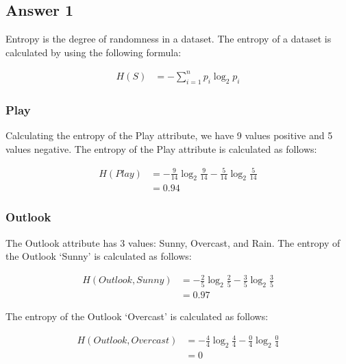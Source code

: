 \documentclass[
  11pt, %
]{assignment}
\begin{document}
\subsection*{Answer 1}

Entropy is the degree of randomness in a dataset. The entropy of a dataset is calculated by using the following formula:

\begin{equation}
	\label{eq:entropy}
	\begin{split}
		H(S) &= -\sum_{i=1}^{n} p_i \log_2 p_i
	\end{split}
\end{equation}

\subsubsection*{Play}

Calculating the entropy of the Play attribute, we have 9 values positive and 5 values negative. The entropy of the Play attribute is calculated as follows:

\begin{equation}
	\label{eq:entropy-play}
	\begin{split}
		H(Play) &= -\frac{9}{14} \log_2 \frac{9}{14} - \frac{5}{14} \log_2 \frac{5}{14} \\
		&= 0.94
	\end{split}
\end{equation}

\subsubsection*{Outlook}

The Outlook attribute has 3 values: Sunny, Overcast, and Rain. The entropy of the Outlook `Sunny' is calculated as follows:

\begin{equation}
	\label{eq:entropy-outlook-sunny}
	\begin{split}
		H(Outlook, Sunny) &= -\frac{2}{5} \log_2 \frac{2}{5} - \frac{3}{5} \log_2 \frac{3}{5} \\
		&= 0.97
	\end{split}
\end{equation}

The entropy of the Outlook `Overcast' is calculated as follows:

\begin{equation}
	\label{eq:entropy-outlook-overcast}
	\begin{split}
		H(Outlook, Overcast) &= -\frac{4}{4} \log_2 \frac{4}{4} - \frac{0}{4} \log_2 \frac{0}{4} \\
		&= 0
	\end{split}
\end{equation}
\end{document}
